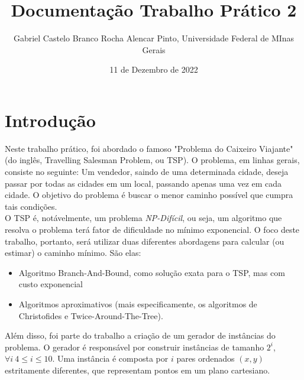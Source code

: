 \documentclass{article}
\begin{document}
\title{Documentação Trabalho Prático 2}
\author{Gabriel Castelo Branco Rocha Alencar Pinto, Universidade Federal de MInas Gerais}

\date{11 de Dezembro de 2022}
\maketitle

\section{Introdução}
Neste trabalho prático, foi abordado o famoso "Problema do Caixeiro Viajante" (do inglês, Travelling Salesman Problem, ou TSP). O problema, em linhas gerais, consiste no seguinte: Um vendedor, saindo de uma determinada cidade, deseja passar por todas as cidades em um local, passando apenas uma vez em cada cidade. O objetivo do problema é buscar o menor caminho possível que cumpra tais condições. \\ O TSP é, notávelmente, um problema \textit{NP-Difícil}, ou seja, um algoritmo que resolva o problema terá fator de dificuldade no mínimo exponencial. O foco deste trabalho, portanto, será utilizar duas diferentes abordagens para calcular (ou estimar) o caminho mínimo. São elas:

\begin{itemize}
    \item Algoritmo Branch-And-Bound, como solução exata para o TSP, mas com custo exponencial
    \item Algoritmos aproximativos (mais especificamente, os algoritmos de Christofides e Twice-Around-The-Tree). 
\end{itemize}
Além disso, foi parte do trabalho a criação de um gerador de instâncias do problema. O gerador é responsável por construir instâncias de tamanho $2^i$, $\forall{i}\ 4 \le i \le 10$. Uma instância é composta por $i$ pares ordenados $(x, y)$ estritamente diferentes, que representam pontos em um plano cartesiano. 
\end{document}
